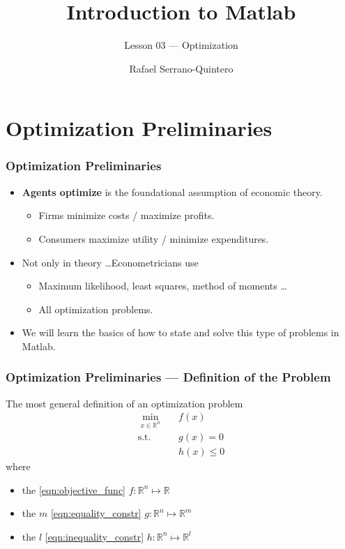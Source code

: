 \documentclass[11pt,xcolor={svgnames},aspectratio=169,usepdftitle=false,notheorems]{beamer}
\title{Introduction to Matlab}
\subtitle{Lesson 03 --- Optimization}
\author{Rafael Serrano-Quintero}
\institute{Department of Economics \\ University of Barcelona}
\date{}
\begin{document}
\VerbatimFootnotes

\maketitle

\section{Optimization Preliminaries}

\begin{frame}
  \frametitle{Optimization Preliminaries}
\begin{itemize}
  \item \alert{\textbf{Agents optimize}} is the foundational assumption of economic theory.
  \begin{itemize}
    \item Firms minimize costs / maximize profits.
    \item Consumers maximize utility / minimize expenditures.
  \end{itemize}
  \item Not only in theory \ldots Econometricians use
  \begin{itemize}
    \item Maximum likelihood, least squares, method of moments \ldots
    \item All optimization problems.
  \end{itemize}
  \item We will learn the basics of how to state and solve this type of problems in Matlab.
\end{itemize}
\end{frame}

\begin{frame}
  \frametitle{Optimization Preliminaries --- Definition of the Problem}
The most general definition of an optimization problem
\begin{align}
  \underset{x\in\mathbb{R}^n}{\min} \phantom{\Omega} &   f(x) \tag{Objective Function} \label{eqn:objective_func} \\
  \text{s.t. } & g(x) = 0 \tag{Equality Constraints} \label{eqn:equality_constr} \\
  \phantom{\text{s.t.}} & h(x) \leq 0 \tag{Inequality Constraints} \label{eqn:inequality_constr}
\end{align}
where
\begin{itemize}
  \item the \ref{eqn:objective_func} $f :\mathbb{R}^n\mapsto \mathbb{R}$
  \item the $m$ \ref{eqn:equality_constr} $g :\mathbb{R}^n\mapsto \mathbb{R}^m$
  \item the $l$ \ref{eqn:inequality_constr} $h :\mathbb{R}^n\mapsto \mathbb{R}^l$
\end{itemize}
\end{frame}
\end{document}
